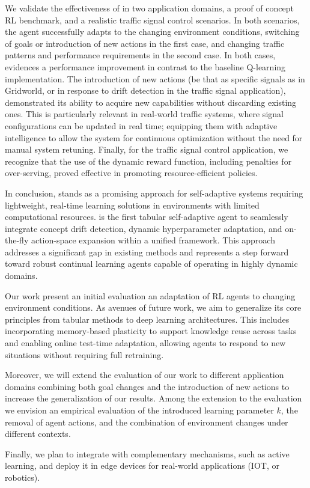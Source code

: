 We validate the effectiveness of \adaptiverl in two application domains, a proof of concept \ac{RL} 
benchmark, and a realistic traffic signal control scenarios. In both scenarios, the \adaptiverl agent 
successfully adapts to the changing environment conditions, switching of goals or introduction of new 
actions in the first case, and changing traffic patterns and performance requirements in the second 
case. In both cases, \adaptiverl evidences a performance improvement in contrast to the baseline 
Q-learning implementation.
The introduction of new actions (be that as specific signals as in Gridworld, or in response to 
drift detection in the traffic signal application), \adaptiverl demonstrated its ability to acquire new 
capabilities without discarding existing ones. This is particularly relevant in real-world traffic systems, 
where signal configurations can be updated in real time; equipping them with adaptive intelligence to 
allow the system for continuous optimization without the need for manual system retuning.
Finally, for the traffic signal control application, we recognize that the use of the dynamic reward 
function, including penalties for over-serving, proved effective in promoting resource-efficient policies. 

In conclusion, \adaptiverl stands as a promising approach for self-adaptive systems requiring 
lightweight, real-time learning solutions in environments with limited computational resources.
\adaptiverl is the first tabular self-adaptive agent to seamlessly integrate concept drift detection, 
dynamic hyperparameter adaptation, and on-the-fly action-space expansion within a unified 
framework. This approach addresses a significant gap in existing methods and represents a step 
forward toward robust continual learning agents capable of operating in highly dynamic domains.

Our work present an initial evaluation an adaptation of \ac{RL} agents to changing environment 
conditions. As avenues of future work, we aim to generalize its core principles from tabular methods to 
deep learning architectures. This includes incorporating memory-based plasticity to support knowledge 
reuse across tasks and enabling online test-time adaptation, allowing agents to respond to new 
situations without requiring full retraining.

Moreover, we will extend the evaluation of our work to different application domains combining both 
goal changes and the introduction of new actions to increase the generalization of our results. Among 
the extension to the evaluation we envision an empirical evaluation of the introduced learning 
parameter $k$, the removal of agent actions, and the combination of environment changes under 
different contexts.

Finally, we plan to integrate \adaptiverl with complementary mechanisms, such as active learning, and 
deploy it in edge devices for real-world applications (\eg \ac{IOT}, or robotics).  


\endinput

